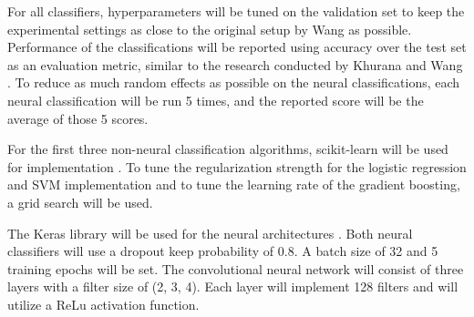 For all classifiers, hyperparameters will be tuned on the validation set to keep the experimental settings as close to the original setup by Wang as possible.
Performance of the classifications will be reported using accuracy over the test set as an evaluation metric, similar to the research conducted by Khurana and Wang \cite{wang2018}\cite{khurana2017}. 
To reduce as much random effects as possible on the neural classifications, each neural classification will be run 5 times, and the reported score will be the average of those 5 scores. 

For the first three non-neural classification algorithms, scikit-learn will be used for implementation \cite{scikit-learn}. 
To tune the regularization strength for the logistic regression and SVM implementation and to tune the learning rate of the gradient boosting, a grid search will be used. 

The Keras library will be used for the neural architectures \cite{keras}.
Both neural classifiers will use a dropout keep probability of 0.8.
A batch size of 32 and 5 training epochs will be set. 
The convolutional neural network will consist of three layers with a filter size of (2, 3, 4).
Each layer will implement 128 filters and will utilize a ReLu activation function.